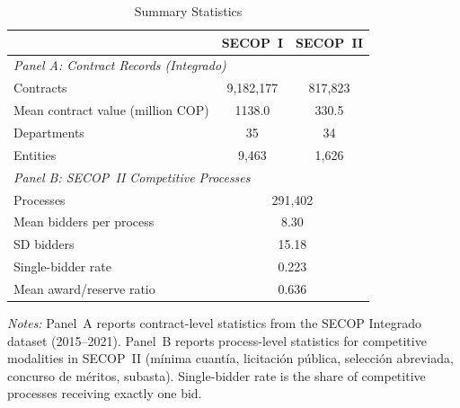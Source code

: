 \begin{table}
\begin{threeparttable}[t]
\centering
\caption{Summary Statistics}
\label{tab:summary}
\small
\begin{tabular}{lcc}
\toprule
 & SECOP~I & SECOP~II \\
\midrule
\multicolumn{3}{l}{\textit{Panel A: Contract Records (Integrado)}} \\[3pt]
Contracts & 9,182,177 & 817,823 \\
Mean contract value (million COP) & 1138.0 & 330.5 \\
Departments & 35 & 34 \\
Entities & 9,463 & 1,626 \\
\midrule
\multicolumn{3}{l}{\textit{Panel B: SECOP~II Competitive Processes}} \\[3pt]
Processes & \multicolumn{2}{c}{291,402} \\
Mean bidders per process & \multicolumn{2}{c}{8.30} \\
SD bidders & \multicolumn{2}{c}{15.18} \\
Single-bidder rate & \multicolumn{2}{c}{0.223} \\
Mean award/reserve ratio & \multicolumn{2}{c}{0.636} \\
\bottomrule
\end{tabular}
\begin{tablenotes}[flushleft]\small
\item \textit{Notes:} Panel~A reports contract-level statistics from the SECOP Integrado dataset (2015--2021). Panel~B reports process-level statistics for competitive modalities in SECOP~II (m\'{i}nima cuant\'{i}a, licitaci\'{o}n p\'{u}blica, selecci\'{o}n abreviada, concurso de m\'{e}ritos, subasta). Single-bidder rate is the share of competitive processes receiving exactly one bid.
\end{tablenotes}
\end{threeparttable}
\end{table}
